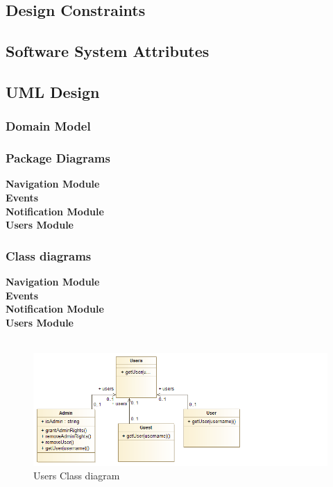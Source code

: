 \documentclass[a4paper,12pt]{report}
\begin{document}
\newpage
\subsection{Design Constraints}
\newpage
\subsection{Software System Attributes}
\newpage
\subsection{UML Design}
\subsubsection{Domain Model}
\subsubsection{Package Diagrams}
\textbf{Navigation Module} \\
\textbf{Events}\\
\textbf{Notification Module}\\
\textbf{Users Module}
	\subsubsection{Class diagrams}
	\textbf{Navigation Module}\\
	\textbf{Events}\\
	\textbf{Notification Module}\\
	\textbf{Users Module}\\\\
	\begin{figure}[h!]
		\includegraphics[width=\linewidth]{class.png}
		\caption{Users Class diagram}
		\label{fig:Users Class diagram}
	\end{figure}
\end{document}

